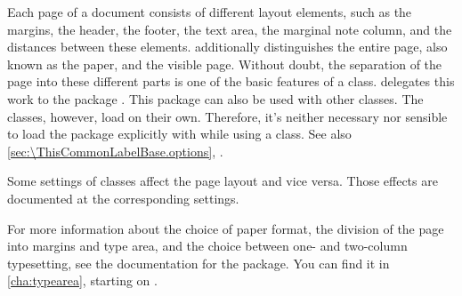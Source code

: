 Each page of a document consists of different layout elements, such as the
margins, the header, the footer, the text area, the marginal note column, and
the distances between these elements. \KOMAScript{} additionally distinguishes
the entire page, also known as the paper, and the visible page. Without doubt,
the separation of the page into these different parts is one of the basic
features of a class.
\KOMAScript{} delegates this work to the package . This
package can also be used with other classes. The \KOMAScript{} classes,
however, load  on their own. Therefore, it's neither
necessary nor sensible to load the package explicitly with 
while using a \KOMAScript{} class. See also 
\autoref{sec:\ThisCommonLabelBase.options},
.

Some settings of \KOMAScript{} classes affect the page layout and vice versa.
Those effects are documented at the corresponding settings.

For more information about the choice of paper format, the division of the
page into margins and type area, and the choice between one- and two-column
typesetting, see the documentation for the  package. You can
find it in \autoref{cha:typearea}, starting on .

